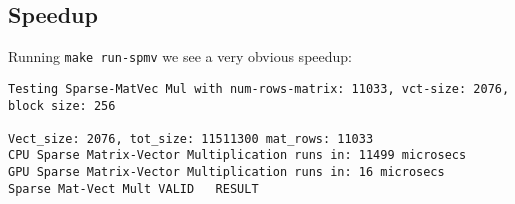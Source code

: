 \documentclass[11pt]{article}
\begin{document}
\subsection{Speedup}
\label{sec:org4bddef1}
Running \texttt{make run-spmv} we see a very obvious speedup:
\begin{verbatim}
Testing Sparse-MatVec Mul with num-rows-matrix: 11033, vct-size: 2076, block size: 256

Vect_size: 2076, tot_size: 11511300 mat_rows: 11033
CPU Sparse Matrix-Vector Multiplication runs in: 11499 microsecs
GPU Sparse Matrix-Vector Multiplication runs in: 16 microsecs
Sparse Mat-Vect Mult VALID   RESULT
\end{verbatim}
\end{document}
